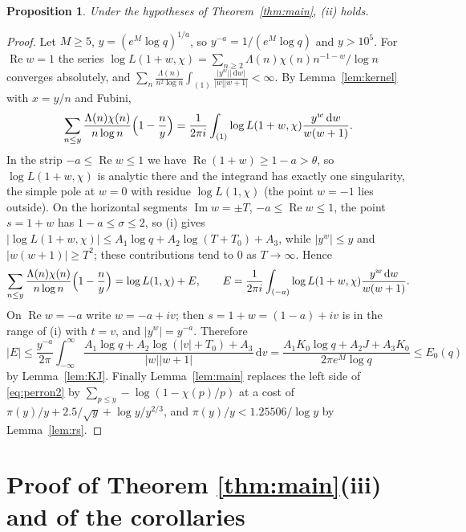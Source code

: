 \documentclass[11pt]{article}
\newtheorem{proposition}[theorem]{Proposition}
\theoremstyle{definition}
\theoremstyle{remark}
\numberwithin{equation}{section}
\newcommand{\Rea}{\operatorname{Re}}
\newcommand{\Ima}{\operatorname{Im}}
\newcommand{\dd}{\,\mathrm{d}}
\begin{document}
\begin{proposition}\label{prop:perron}
Under the hypotheses of Theorem~\ref{thm:main}, \textup{(ii)} holds.
\end{proposition}
\begin{proof}
Let $M\ge5$, $y=(e^M\log q)^{1/a}$, so $y^{-a}=1/(e^M\log q)$ and $y>10^5$. For $\Rea w=1$ the series $\log L(1+w,\chi)=\sum_{n\ge2}\Lambda(n)\chi(n)n^{-1-w}/\log n$ converges absolutely, and $\sum_n\frac{\Lambda(n)}{n^2\log n}\int_{(1)}\frac{|y^w||\dd w|}{|w||w+1|}<\infty$. By Lemma~\ref{lem:kernel} with $x=y/n$ and Fubini,
\begin{equation}\label{eq:perron1}
 \sum_{n\le y}\frac{\Lambda(n)\chi(n)}{n\log n}\Bigl(1-\frac ny\Bigr)=\frac1{2\pi i}\int_{(1)}\log L(1+w,\chi)\frac{y^w\dd w}{w(w+1)} .
\end{equation}
In the strip $-a\le\Rea w\le1$ we have $\Rea(1+w)\ge1-a>\theta$, so $\log L(1+w,\chi)$ is analytic there and the integrand has exactly one singularity, the simple pole at $w=0$ with residue $\log L(1,\chi)$ (the point $w=-1$ lies outside). On the horizontal segments $\Ima w=\pm T$, $-a\le\Rea w\le1$, the point $s=1+w$ has $1-a\le\sigma\le2$, so (i) gives $|\log L(1+w,\chi)|\le A_1\log q+A_2\log(T+T_0)+A_3$, while $|y^w|\le y$ and $|w(w+1)|\ge T^2$; these contributions tend to $0$ as $T\to\infty$. Hence
\begin{equation}\label{eq:perron2}
 \sum_{n\le y}\frac{\Lambda(n)\chi(n)}{n\log n}\Bigl(1-\frac ny\Bigr)=\log L(1,\chi)+E,\qquad E=\frac1{2\pi i}\int_{(-a)}\log L(1+w,\chi)\frac{y^w\dd w}{w(w+1)} .
\end{equation}
On $\Rea w=-a$ write $w=-a+iv$; then $s=1+w=(1-a)+iv$ is in the range of (i) with $t=v$, and $|y^w|=y^{-a}$. Therefore
\[
 |E|\le\frac{y^{-a}}{2\pi}\int_{-\infty}^{\infty}\frac{A_1\log q+A_2\log(|v|+T_0)+A_3}{|w||w+1|}\dd v
 =\frac{A_1K_0\log q+A_2J+A_3K_0}{2\pi e^M\log q}\le E_0(q)
\]
by Lemma~\ref{lem:KJ}. Finally Lemma~\ref{lem:main} replaces the left side of \eqref{eq:perron2} by $\sum_{p\le y}-\log(1-\chi(p)/p)$ at a cost of $\pi(y)/y+2.5/\sqrt y+\log y/y^{2/3}$, and $\pi(y)/y<1.25506/\log y$ by Lemma~\ref{lem:rs}.
\end{proof}

\section{Proof of Theorem \ref{thm:main}(iii) and of the corollaries}\label{sec:proofs}
\end{document}
